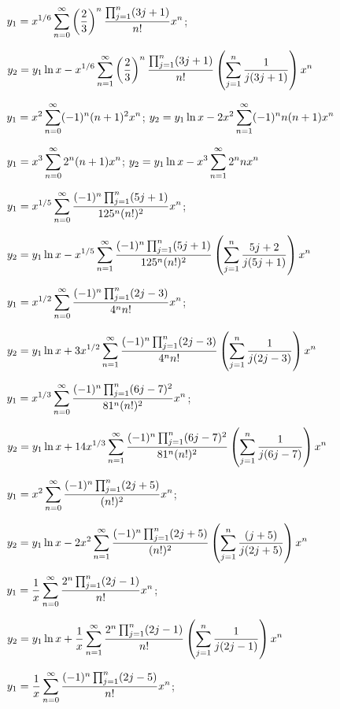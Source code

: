 $\displaystyle{y_{1}=x^{1/6}\sum_{n=0}^{\infty}\left(\frac{2}{3}\right)^{n}
\frac{\prod_{j=1}^{n}(3j+1)}{n!}x^{n}}$;\;

\quad\;  \;\;\;
$\displaystyle{y_{2}=y_{1}\ln x-x^{1/6}\sum_{n=1}^{\infty}
\left(\frac{2}{3}\right)^{n}
\frac{\prod_{j=1}^{n}(3j+1)}{n!}\left(\sum_{j=1}^{n}\frac{1}{j(3j+1)}\right)x^{n}}$

$\displaystyle{y_{1}=x^{2}\sum_{n=0}^{\infty}(-1)^{n}(n+1)^{2}x^{n}}$;\;
$\displaystyle{y_{2}=y_{1}\ln
x-2x^{2}\sum_{n=1}^{\infty}(-1)^{n}n(n+1)x^{n}}$

$\displaystyle{y_{1}=x^{3}\sum_{n=0}^{\infty}2^{n}(n+1)x^{n}}$;\;
$\displaystyle{y_{2}=
y_{1}\ln x-x^{3}\sum_{n=1}^{\infty}2^{n}nx^{n}}$

$\displaystyle{y_{1}=x^{1/5}\sum_{n=0}^{\infty}\frac{(-1)^{n}\prod_{j=1}^{n}(5j+1)}{125^{n}(n!)^{2}}x^{n}}$;\;

\quad\;  \;\;\;
$\displaystyle{y_{2}=
y_{1}\ln
x-x^{1/5}\sum_{n=1}^{\infty}\frac{(-1)^{n}\prod_{j=1}^{n}(5j+1)}{125^{n}(n!)^{2}}
\left(\sum_{j=1}^{n}\frac{5j+2}{j(5j+1)}\right)x^{n}}$

$\displaystyle{y_{1}=x^{1/2}\sum_{n=0}^{\infty}\frac{(-1)^{n}\prod_{j=1}^{n}(2j-3)}{4^{n}n!}
x^{n}}$;\;

\quad\;  \;\;\;
$\displaystyle{y_{2}=y_{1}\ln x+3x^{1/2}\sum_{n=1}^{\infty}
\frac{(-1)^{n}\prod_{j=1}^{n}(2j-3)}{4^{n}n!}\left(\sum_{j=1}^{n}\frac{1}{j(2j-3)}\right)x^{n}}$

$\displaystyle{y_{1}=x^{1/3}\sum_{n=0}^{\infty}\frac{(-1)^{n}\prod_{j=1}^{n}(6j-7)^{2}}{81^{n}(n!)^{2}}
x^{n}}$;\;

\quad\;  \;\;\;
$\displaystyle{y_{2}=y_{1}\ln
x+14x^{1/3}\sum_{n=1}^{\infty}\frac{(-1)^{n}\prod_{j=1}^{n}(6j-7)^{2}}{81^{n}(n!)^{2}}\left(\sum_{j=1}^{n}\frac{1}{j(6j-7)}\right)x^{n}}$

$\displaystyle{y_{1}=x^{2}\sum_{n=0}^{\infty}\frac{(-1)^{n}\prod_{j=1}^{n}(2j+5)}{(n!)^{2}}
x^{n}}$;\;

\quad\;  \;\;\;
$\displaystyle{y_{2}=
y_{1}\ln x-2x^{2}\sum_{n=1}^{\infty}\frac{(-1)^{n}\prod_{j=1}^{n}(2j+5)}{(n!)^{2}}
\left(\sum_{j=1}^{n}\frac{(j+5)}{j(2j+5)}\right)x^{n}}$

$\displaystyle{y_{1}=\frac{1}{x}\sum_{n=0}^{\infty}\frac{2^{n}\prod_{j=1}^{n}(2j-1)}{n!}
x^{n}}$;\;

\quad\;  \;\;\;
$\displaystyle{y_{2}=y_{1}\ln
x+\frac{1}{x}\sum_{n=1}^{\infty}\frac{2^{n}\prod_{j=1}^{n}(2j-1)}{n!}
\left(\sum_{j=1}^{n}\frac{1}{j(2j-1)}\right)x^{n}}$

$\displaystyle{y_{1}=\frac{1}{x}\sum_{n=0}^{\infty}\frac{(-1)^{n}\prod_{j=1}^{n}(2j-5)}{n!}x^{n}}$;\;

